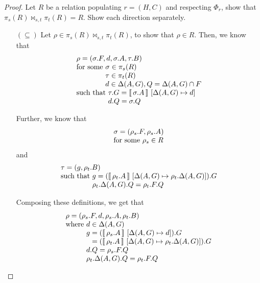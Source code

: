 \begin{proof}
  Let $R$ be a relation populating $r = (H,C)$ and respecting $\Phi_r$, show
  that $\pi_s(R) \bowtie_{s,t} \pi_t(R) = R$. Show each direction
  separately.
  \begin{enumerate}[align=left]
  \item[$(\subseteq)$] Let $\rho \in \pi_s(R) \bowtie_{s,t} \pi_t(R)$,
    to show that $\rho \in R$. Then, we know that
    \[\begin{array}l
        \rho = (\sigma.F, d, \sigma.A, \tau.B)\\
        \text{for some } \sigma \in \pi_s(R)\\
        \phantom{\text{for some }}\tau \in \pi_t(R)\\
        \phantom{\text{for some }}d \in \Delta(A, G), Q = \Delta(A,G) \cap F\\
        \text{such that } \tau.G = \bracbb{\sigma.A}~[\Delta(A,G) \mapsto d] \\
        \phantom{\text{such that }} d.Q = \sigma.Q
      \end{array} \]

    Further, we know that
    \[\begin{array}l
        \sigma = (\rho_s.F, \rho_s.A)\\
        \text{for some } \rho_s \in R\\
      \end{array}
    \]
    and
    \[\begin{array}l  
        \tau = (g, \rho_t.B) \\
        \text{such that } g = (\bracbb{\rho_t.A}~[\Delta(A,G) \mapsto \rho_t.\Delta(A,G)]).G \\
        \phantom{\text{such that }}\rho_t.\Delta(A,G).Q = \rho_t.F.Q
      \end{array}\]

    Composing these definitions, we get that
    \[\begin{array}l
        \rho = (\rho_s.F, d, \rho_s.A, \rho_t.B) \\
        \text{where } d \in \Delta(A, G)\\
        \phantom{\text{where }} g = (\bracbb{\rho_s.A}~[\Delta(A,G) \mapsto d]).G\\
        \phantom{\text{where } g} = (\bracbb{\rho_t.A}~[\Delta(A,G) \mapsto \rho_t.\Delta(A,G)]).G \\
        \phantom{\text{where }} d.Q = \rho_s.F.Q \\
        \phantom{\text{where }} \rho_t.\Delta(A,G).Q = \rho_t.F.Q 
      \end{array}\]
    

\end{enumerate}
\end{proof}
